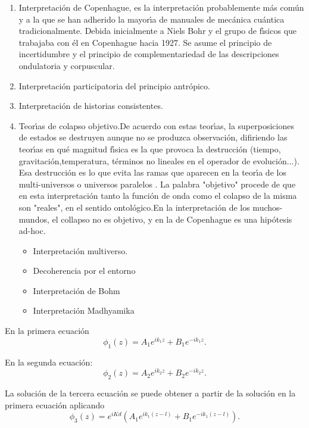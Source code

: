 \begin{enumerate}
\item Interpretaci\'{o}n de Copenhague, es la interpretaci\'{o}n probablemente m\'{a}s com\'{u}n y a la
  que se han adherido la mayor\'{\i}a de manuales de mec\'{a}nica cu\'{a}ntica tradicionalmente. Debida
  inicialmente a Niels Bohr y el grupo de f\'{\i}sicos que trabajaba con \'{e}l en Copenhague hacia
  1927. Se asume el principio de incertidumbre y el principio de complementariedad de las
  descripciones ondulatoria y corpuscular.
\item Interpretaci\'{o}n participatoria del principio antr\'{o}pico.
\item Interpretaci\'{o}n de historias consistentes.
\item Teor\'{\i}as de colapso objetivo.De acuerdo con estas teor\'{\i}as, la superposiciones de
  estados se destruyen aunque no se produzca observaci\'{o}n, difiriendo las teor\'{\i}as en qu\'{e}
  magnitud f\'{\i}sica es la que provoca la destrucci\'{o}n (tiempo, gravitaci\'{o}n,temperatura,
  t\'{e}rminos no lineales en el operador de evoluci\'{o}n...). Esa destrucci\'{o}n es lo que evita
  las ramas que aparecen en la teor\'{\i}a de los multi-universos o universos paralelos . La
  palabra "objetivo" procede de que en esta interpretaci\'{o}n tanto la funci\'{o}n de onda como
  el colapso de la misma son "reales", en el sentido ontol\'{o}gico.En la interpretaci\'{o}n de
  los muchos-mundos, el collapso no es objetivo, y en la de Copenhague es una hip\'{o}tesis
  ad-hoc.

  \begin{itemize}
  \item Interpretaci\'{o}n multiverso.
  \item Decoherencia por el entorno
  \item Interpretaci\'{o}n de Bohm
  \item Interpretaci\'{o}n Madhyamika
  \end{itemize}
\end{enumerate}

En la primera ecuaci\'{o}n
\begin{equation}
\phi_{1}(z)=A_{1}e^{ik_{1}z}+B_{1}e^{-ik_{1}z}.
\end{equation}

En la segunda ecuaci\'{o}n:
\begin{equation}
\phi_{2}(z)=A_{2}e^{ik_{2}z}+B_{2}e^{-ik_{2}z}.
\end{equation}

La soluci\'{o}n de la tercera ecuaci\'{o}n se puede obtener a partir de la
soluci\'{o}n en la primera ecuaci\'{o}n aplicando 
\begin{equation}
\phi_{3}(z)=e^{iKd}(A_{1}e^{ik_{1}(z-l)}+B_{1}e^{-ik_{1}(z-l)}).
\end{equation}


